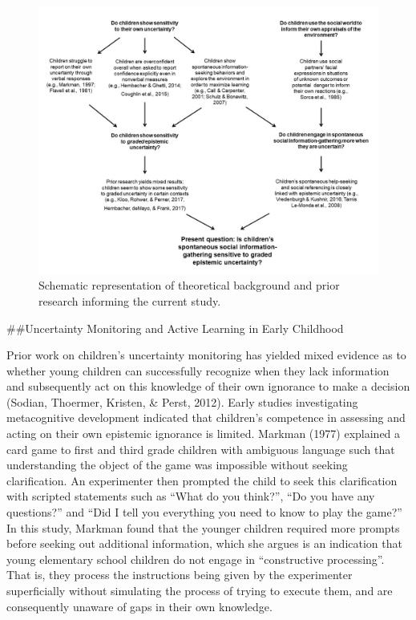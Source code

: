 \documentclass[,man,floatsintext]{apa6}
\begin{document}
\begin{figure}

{\centering \includegraphics{../images/diagram_lit_review_1} 

}

\caption{Schematic representation of theoretical background and prior research informing the current study.}\label{fig:schematic}
\end{figure}

\#\#Uncertainty Monitoring and Active Learning in Early Childhood

Prior work on children's uncertainty monitoring has yielded mixed evidence as to whether young children can successfully recognize when they lack information and subsequently act on this knowledge of their own ignorance to make a decision (Sodian, Thoermer, Kristen, \& Perst, 2012). Early studies investigating metacognitive development indicated that children's competence in assessing and acting on their own epistemic ignorance is limited. Markman (1977) explained a card game to first and third grade children with ambiguous language such that understanding the object of the game was impossible without seeking clarification. An experimenter then prompted the child to seek this clarification with scripted statements such as \enquote{What do you think?}, \enquote{Do you have any questions?} and \enquote{Did I tell you everything you need to know to play the game?} In this study, Markman found that the younger children required more prompts before seeking out additional information, which she argues is an indication that young elementary school children do not engage in \enquote{constructive processing}. That is, they process the instructions being given by the experimenter superficially without simulating the process of trying to execute them, and are consequently unaware of gaps in their own knowledge.
\end{document}
